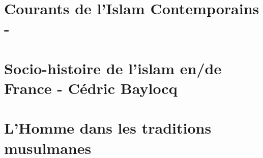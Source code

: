 \documentclass[oneside,10pt]{book}
\begin{document}
\part{Courants de l'Islam Contemporains - }


%















 


%

 

\part{Socio-histoire de l’islam en/de France - Cédric Baylocq}











  
  \part{L'Homme dans les traditions musulmanes}
 
 
 
 
 
    
   

%
 
   

 


%

\printbibliography

%
\end{document}
